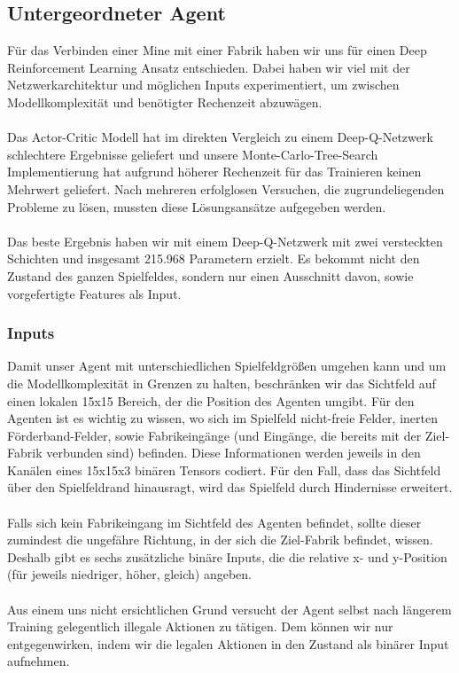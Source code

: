 \subsection{Untergeordneter Agent}
Für das Verbinden einer Mine mit einer Fabrik haben wir uns für einen Deep Reinforcement Learning Ansatz entschieden. Dabei haben wir viel mit der Netzwerkarchitektur und möglichen Inputs experimentiert, um zwischen Modellkomplexität und benötigter Rechenzeit abzuwägen. 
\\\\
Das Actor-Critic Modell hat im direkten Vergleich zu einem Deep-Q-Netzwerk schlechtere Ergebnisse geliefert und unsere Monte-Carlo-Tree-Search Implementierung hat aufgrund höherer Rechenzeit für das Trainieren keinen Mehrwert geliefert. Nach mehreren erfolglosen Versuchen, die zugrundeliegenden Probleme zu lösen, mussten diese Lösungsansätze aufgegeben werden.
\\\\
Das beste Ergebnis haben wir mit einem Deep-Q-Netzwerk mit zwei versteckten Schichten und insgesamt 215.968 Parametern erzielt. Es bekommt nicht den Zustand des ganzen Spielfeldes, sondern nur einen Ausschnitt davon, sowie vorgefertigte Features als Input.
\subsubsection{Inputs}
Damit unser Agent mit unterschiedlichen Spielfeldgrößen umgehen kann und um die Modellkomplexität in Grenzen zu halten, beschränken wir das Sichtfeld auf einen lokalen 15x15 Bereich, der die Position des Agenten umgibt. 
Für den Agenten ist es wichtig zu wissen, wo sich im Spielfeld nicht-freie Felder, inerten Förderband-Felder, sowie Fabrikeingänge (und Eingänge, die bereits mit der Ziel-Fabrik verbunden sind) befinden. Diese Informationen werden jeweils in den Kanälen eines  15x15x3 binären Tensors codiert. 
Für den Fall, dass das Sichtfeld über den Spielfeldrand hinausragt, wird das Spielfeld durch Hindernisse erweitert.
\\\\
Falls sich kein Fabrikeingang im Sichtfeld des Agenten befindet, sollte dieser zumindest die ungefähre Richtung, in der sich die Ziel-Fabrik befindet, wissen. Deshalb gibt es sechs zusätzliche binäre Inputs, die die relative x- und y-Position (für jeweils niedriger, höher, gleich) angeben.
\\\\
Aus einem uns nicht ersichtlichen Grund versucht der Agent selbst nach längerem Training gelegentlich illegale Aktionen zu tätigen. Dem können wir nur entgegenwirken, indem wir die legalen Aktionen in den Zustand als binärer Input aufnehmen. 
